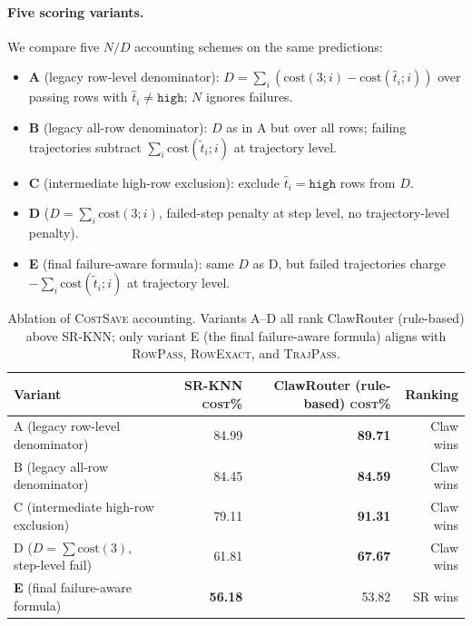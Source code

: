 \paragraph{Five scoring variants.}
We compare five $N/D$ accounting schemes on the same predictions:

\begin{itemize}
\item \textbf{A} (legacy row-level denominator): $D = \sum_i (\mathrm{cost}(3;i) - \mathrm{cost}(\hat{t}_i;i))$ over passing rows with $\hat{t}_i \ne \texttt{high}$; $N$ ignores failures.
\item \textbf{B} (legacy all-row denominator): $D$ as in A but over all rows; failing trajectories subtract $\sum_i \mathrm{cost}(\tilde{t}_i;i)$ at trajectory level.
\item \textbf{C} (intermediate high-row exclusion): exclude $\hat{t}_i=\texttt{high}$ rows from $D$.
\item \textbf{D} ($D = \sum_i \mathrm{cost}(3;i)$, failed-step penalty at step level, no trajectory-level penalty).
\item \textbf{E} (final failure-aware formula): same $D$ as D, but failed trajectories charge $-\sum_i \mathrm{cost}(\tilde{t}_i;i)$ at trajectory level.
\end{itemize}

\begin{table}[ht]
\centering
\small
\caption{Ablation of \textsc{CostSave} accounting. Variants A--D all rank ClawRouter (rule-based) above SR-KNN;
only variant E (the final failure-aware formula) aligns with \textsc{RowPass}, \textsc{RowExact}, and \textsc{TrajPass}.}
\label{tab:ablation-scoring}
\begin{tabular}{lrrr}
\toprule
Variant & SR-KNN \textsc{cost}\% & ClawRouter (rule-based) \textsc{cost}\% & Ranking \\
\midrule
A (legacy row-level denominator)                  & 84.99 & \textbf{89.71} & Claw wins \\
B (legacy all-row denominator)                    & 84.45 & \textbf{84.59} & Claw wins \\
C (intermediate high-row exclusion)               & 79.11 & \textbf{91.31} & Claw wins \\
D ($D=\sum\mathrm{cost}(3)$, step-level fail)    & 61.81 & \textbf{67.67} & Claw wins \\
\textbf{E} (final failure-aware formula)          & \textbf{56.18} & 53.82 & SR wins \\
\bottomrule
\end{tabular}
\end{table}

